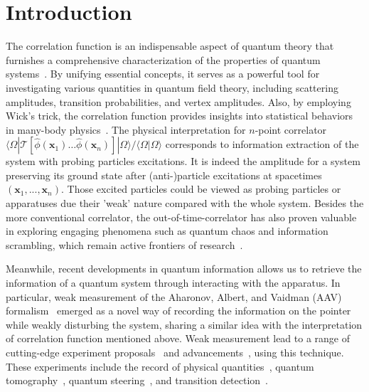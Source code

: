 \documentclass[twocolumn,pra,aps,superscriptaddress]{revtex4-2}
\begin{document}
\section{Introduction}
The correlation function is an indispensable aspect of quantum theory that furnishes a comprehensive characterization of the properties of quantum systems~\cite{GFJS}. By unifying essential  concepts, it serves as a powerful tool for investigating various quantities in quantum field theory, including scattering amplitudes, transition probabilities, and vertex amplitudes. Also, by employing Wick's trick, the correlation function provides insights into statistical behaviors in many-body physics~\cite{QSM}.  The physical interpretation for $n$-point correlator $\langle\Omega| \mathcal{T}[\hat{\phi}(\textbf{x}_1)\ldots\hat{\phi}(\textbf{x}_n)]|\Omega\rangle/\langle\Omega|\Omega\rangle$  corresponds to information extraction of the system with probing particles excitations. It is indeed the amplitude for a system preserving its ground state after (anti-)particle excitations at spacetimes $(\textbf{x}_1,...,\textbf{x}_n)$. Those excited particles could be viewed as probing particles or apparatuses due their 'weak' nature compared with the whole system. Besides the more conventional correlator, the out-of-time-correlator has also proven valuable in exploring engaging phenomena such as quantum chaos and information scrambling, which remain active frontiers of research~\cite{JHEPOTOC,JEOTOC,scrambling,OTOCtopo}. 

Meanwhile, recent developments in quantum information allows us to retrieve the information of a quantum system  through interacting with the apparatus. In particular, weak measurement of the Aharonov, Albert, and Vaidman (AAV) formalism~\cite{AAV} emerged as a novel way of recording the information on the pointer while weakly disturbing the system, sharing a similar idea with the interpretation of correlation function mentioned above.  Weak measurement lead to a range  of  cutting-edge experiment proposals~\cite{bomb,cheshire} and advancements~\cite{dondeestabas,foundation}, using this technique. These experiments include the record of physical quantities~\cite{geometric,eraser,discord}, quantum tomography~\cite{tomo,tomosc}, quantum steering~\cite{steering,gefen,sqc}, and transition detection~\cite{w2s,topological}.
\end{document}
